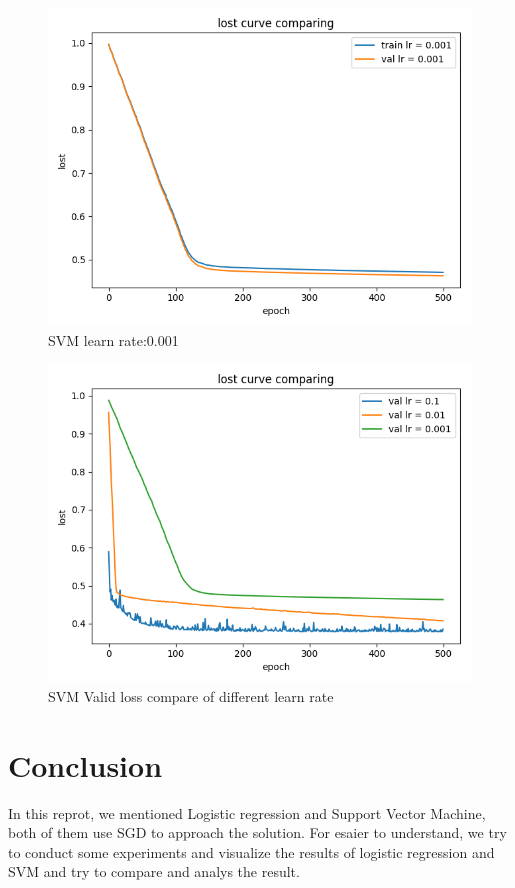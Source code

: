 \documentclass[journal, a4paper]{IEEEtran}
\begin{document}
\begin{figure}[!htb]
	\begin{center}
	\includegraphics[width=\columnwidth]{lc_001}
	\caption{SVM learn rate:0.001}
	\label{fig:lc_001}
	\end{center}
\end{figure}
\begin{figure}[!htb]
	\begin{center}
	\includegraphics[width=\columnwidth]{lc_val_cp}
	\caption{SVM Valid loss compare of different learn rate}
	\label{fig:lc_val_cp}
	\end{center}
\end{figure}
\section{Conclusion}
In this reprot, we mentioned Logistic regression and Support Vector Machine, both of them use  SGD to approach the solution. For esaier to understand, we try to conduct some experiments and visualize the results of logistic regression and SVM and try to compare and analys the result. 

\end{document}
